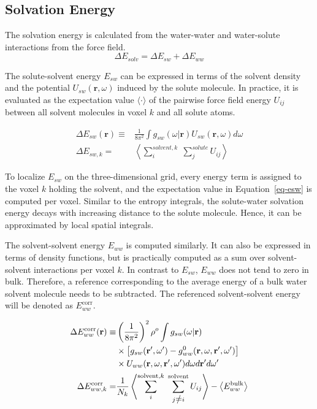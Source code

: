 \documentclass[9pt,tutorial]{livecoms}
\renewcommand{\neq}{\setbox0\hbox{=}\rlap{\hbox to \wd0{\hss /\hss}}\box0}
\begin{document}
\subsection{Solvation Energy}
The solvation energy is calculated from the water-water and water-solute interactions from the force field.
\begin{equation}
	\Delta E_\textit{solv} = \Delta E_\textit{sw} + \Delta E_\textit{ww}
\end{equation}

The solute-solvent energy $E_{sw}$ can be expressed in terms of the solvent density and the potential $U_{sw}(\textbf{r},\omega)$ induced by the solute molecule.
In practice, it is evaluated as the expectation value $\langle\cdot\rangle$ of the pairwise force field energy $U_{ij}$ between all solvent molecules in voxel $k$ and all solute atoms.

\begin{equation}
	\begin{aligned}
		\label{eq-esw}
		\Delta E_{sw}(\textbf{r}) \equiv& \frac{1}{8\pi^2} \int g_\textit{sw}\left(\omega|\textbf{r}\right) U_\textit{sw}\left(\textbf{r}, \omega\right) d\omega \\
		\Delta E_{sw,k}=& \left\langle \sum_i^{\textit{solvent},k} \; \sum_j^\textit{solute} U_{ij}\right\rangle
	\end{aligned}
\end{equation}

To localize $E_{sw}$ on the three-dimensional grid, every energy term is assigned to the voxel $k$ holding the solvent, and the expectation value in Equation~\ref{eq-esw} is computed per voxel.
Similar to the entropy integrals, the solute-water solvation energy decays with increasing distance to the solute molecule.
Hence, it can be approximated by local spatial integrals. 

The solvent-solvent energy $E_{ww}$ is computed similarly.
It can also be expressed in terms of density functions, but is practically computed as a sum over solvent-solvent interactions per voxel $k$.
In contrast to $E_{sw}$, $E_{ww}$ does not tend to zero in bulk.
Therefore, a reference corresponding to the average energy of a bulk water solvent molecule needs to be subtracted.
The referenced solvent-solvent energy will be denoted as $E_{ww}^\text{corr}$.

\begin{equation}
	\begin{aligned}
		\Delta E_{ww}^\text{corr}(\textbf{r}) \equiv & \left(\frac{1}{8\pi^2} \right)^2 \rho^o \int g_{sw}(\omega|\textbf{r}) \\
			& \times \left[g_{sw}(\textbf{r}^\prime , \omega^\prime) - g^0_{ww} (\textbf{r}, \omega, \textbf{r}^\prime, \omega^\prime )\right] \\
			& \times U_{ww}(\textbf{r}, \omega, \textbf{r}^\prime, \omega^\prime)d\omega d\textbf{r}^\prime d\omega^\prime \\
		\Delta E_{ww,k}^\text{corr} =& \frac{1}{N_k} \left\langle \sum_i^{\text{solvent},k} \; \sum_{j \neq i}^\text{solvent} U_{ij}\right\rangle - \left\langle E_{ww}^\text{bulk}\right\rangle
	\end{aligned}
\end{equation}
\end{document}
